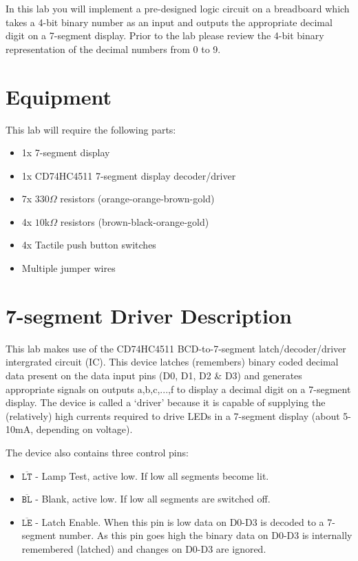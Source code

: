 \documentclass{UoNMCHA}
\numberwithin{equation}{section}
\begin{document}
In this lab you will implement a pre-designed logic circuit on a breadboard which takes a 4-bit binary number as an input and outputs the appropriate decimal digit on a 7-segment display. Prior to the lab please review the 4-bit binary representation of the decimal numbers from 0 to 9.

\section{Equipment}

This lab will require the following parts:

\begin{itemize}
    \item 1x 7-segment display
    \item 1x CD74HC4511 7-segment display decoder/driver
    \item 7x $330\Omega$ resistors (orange-orange-brown-gold)
    \item 4x $10$k$\Omega$ resistors (brown-black-orange-gold)
    \item 4x Tactile push button switches
    \item Multiple jumper wires
\end{itemize}

\section{7-segment Driver Description}

This lab makes use of the CD74HC4511 BCD-to-7-segment latch/decoder/driver intergrated circuit (IC). This device latches (remembers) binary coded decimal data present on the data input pins (D0, D1, D2 \& D3) and generates appropriate signals on outputs a,b,c,...,f to display a decimal digit on a 7-segment display. The device is called a `driver' because it is capable of supplying the (relatively) high currents required to drive LEDs in a 7-segment display (about 5-10mA, depending on voltage).

The device also contains three control pins:

\begin{itemize}
    \item $\overline{\texttt{LT}}$ - Lamp Test, active low. If low all segments become lit.
    \item $\overline{\texttt{BL}}$ - Blank, active low. If low all segments are switched off.
    \item $\overline{\texttt{LE}}$ - Latch Enable. When this pin is low data on D0-D3 is decoded to a 7-segment number. As this pin goes high the binary data on D0-D3 is internally remembered (latched) and changes on D0-D3 are ignored.
\end{itemize}
\end{document}
